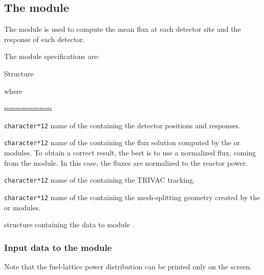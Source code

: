 \subsection{The  module}\label{sect:flpow}

\vskip 0.2cm
The  module is used to compute the mean flux at each detector site
and the response of each detector.

\noindent
The  module specifications are:

\begin{DataStructure}{Structure }
 \moc{:=}      
 \moc{::}
  \moc{;}
\end{DataStructure}

\noindent where

\begin{ListeDeDescription}{mmmmmmmm}

\item[\dusa{DETEC}] \texttt{character*12} name of the 
containing the detector positions and responses. 

\item[\dusa{FLUX}] \texttt{character*12} name of the   
containing the flux solution computed by
the  or  modules. To obtain a correct result, the best is to
use a normalized flux, coming from the  module. In this case, the fluxes
are normalized to the reactor power.

\item[\dusa{TRACK}] \texttt{character*12} name of the 
containing the TRIVAC tracking.

\item[\dusa{GEOM}] \texttt{character*12} name of the  
containing the mesh-splitting geometry created by the
 or  modules.

\item[\dstr{descdetect}] structure containing the data to module 
.

\end{ListeDeDescription}

\vskip 0.2cm

\subsubsection{Input data to the  module}

\noindent
Note that the fuel-lattice power distribution can be printed only on the screen.\\

